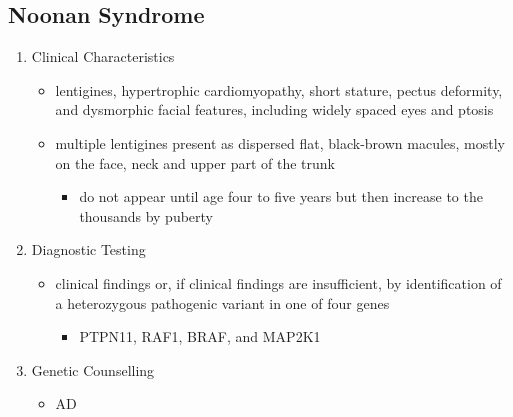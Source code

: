 \documentclass[12pt]{scrartcl}
\begin{document}
\subsection{Noonan Syndrome}
\label{sec:orgb7b4bc0}
\begin{enumerate}
\item Clinical Characteristics
\label{sec:orge3f5f11}
\begin{itemize}
\item lentigines, hypertrophic cardiomyopathy, short stature, pectus
deformity, and dysmorphic facial features, including widely spaced
eyes and ptosis
\item multiple lentigines present as dispersed flat, black-brown macules,
mostly on the face, neck and upper part of the trunk
\begin{itemize}
\item do not appear until age four to five years but then increase to
the thousands by puberty
\end{itemize}
\end{itemize}
\item Diagnostic Testing
\label{sec:org5ceb8a2}
\begin{itemize}
\item clinical findings or, if clinical findings are insufficient, by
identification of a heterozygous pathogenic variant in one of four
genes
\begin{itemize}
\item PTPN11, RAF1, BRAF, and MAP2K1
\end{itemize}
\end{itemize}
\item Genetic Counselling
\label{sec:org9e66028}
\begin{itemize}
\item AD
\end{itemize}
\end{enumerate}
\end{document}
